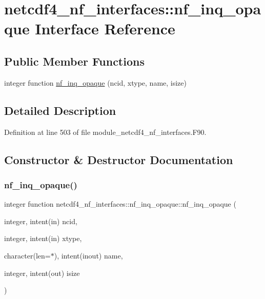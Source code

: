 \hypertarget{interfacenetcdf4__nf__interfaces_1_1nf__inq__opaque}{}\section{netcdf4\+\_\+nf\+\_\+interfaces\+:\+:nf\+\_\+inq\+\_\+opaque Interface Reference}
\label{interfacenetcdf4__nf__interfaces_1_1nf__inq__opaque}
\subsection*{Public Member Functions}
\begin{DoxyCompactItemize}
\item 
integer function \hyperlink{interfacenetcdf4__nf__interfaces_1_1nf__inq__opaque_aa8cc94dd29fdeaa1cc4e3a57e418f585}{nf\+\_\+inq\+\_\+opaque} (ncid, xtype, name, isize)
\end{DoxyCompactItemize}


\subsection{Detailed Description}


Definition at line 503 of file module\+\_\+netcdf4\+\_\+nf\+\_\+interfaces.\+F90.



\subsection{Constructor \& Destructor Documentation}
\mbox{\label{interfacenetcdf4__nf__interfaces_1_1nf__inq__opaque_aa8cc94dd29fdeaa1cc4e3a57e418f585}} 
\subsubsection{\texorpdfstring{nf\+\_\+inq\+\_\+opaque()}{nf\_inq\_opaque()}}
{\footnotesize\ttfamily integer function netcdf4\+\_\+nf\+\_\+interfaces\+::nf\+\_\+inq\+\_\+opaque\+::nf\+\_\+inq\+\_\+opaque (\begin{DoxyParamCaption}\item[{integer, intent(in)}]{ncid,  }\item[{integer, intent(in)}]{xtype,  }\item[{character(len=$\ast$), intent(inout)}]{name,  }\item[{integer, intent(out)}]{isize }\end{DoxyParamCaption})}



